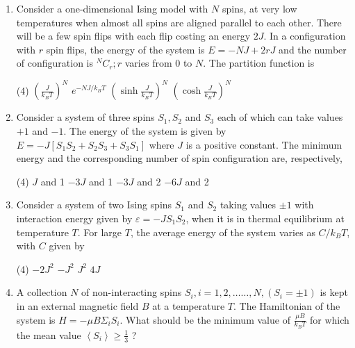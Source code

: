 \begin{enumerate}
\begin{tasks}
		\task[\textbf{b.}]Oscillates during evolution to equilibrium
		\task[\textbf{c.}]Is a maximum at equilibrium
		\task[\textbf{d.}]Is a minimum at equilibrium 
	\end{tasks}
\item 	Consider a one-dimensional Ising model with $N$ spins, at very low temperatures when almost all spins are aligned parallel to each other. There will be a few spin flips with each flip costing an energy $2 J$. In a configuration with $r$ spin flips, the energy of the system is $E=-N J+2 r J$ and the number of configuration is ${ }^{N} C_{r} ; r$ varies from 0 to $N$. The partition function is
{	}
	 \begin{tasks}(4)
		\task[\textbf{a.}] $\left(\frac{J}{k_{B} T}\right)^{N}$
		\task[\textbf{b.}]$e^{-N J / k_{B} T}$
		\task[\textbf{c.}] $\left(\sinh \frac{J}{k_{B} T}\right)^{N}$
		\task[\textbf{d.}] $\left(\cosh \frac{J}{k_{B} T}\right)^{N}$
	\end{tasks}
	\item Consider a system of three spins $S_{1}, S_{2}$ and $S_{3}$ each of which can take values $+1$ and $-1$. The energy of the system is given by $E=-J\left[S_{1} S_{2}+S_{2} S_{3}+S_{3} S_{1}\right]$ where $J$ is a positive constant. The minimum energy and the corresponding number of spin configuration are, respectively,
	{	}
	 \begin{tasks}(4)
		\task[\textbf{a.}]$J$ and 1
		\task[\textbf{b.}]$-3 J$ and 1
		\task[\textbf{c.}]$-3 J$ and 2
		\task[\textbf{d.}]  $-6 J$ and 2
	\end{tasks}
\item 	Consider a system of two Ising spins $S_{1}$ and $S_{2}$ taking values $\pm 1$ with interaction energy given by $\varepsilon=-J S_{1} S_{2}$, when it is in thermal equilibrium at temperature $T$. For large $T$, the average energy of the system varies as $C / k_{B} T$, with $C$ given by
{	}
	 \begin{tasks}(4)
		\task[\textbf{a.}]$-2 J^{2}$
		\task[\textbf{b.}] $-J^{2}$
		\task[\textbf{c.}]$J^{2}$
		\task[\textbf{d.}] $4 J$ 
	\end{tasks}
\item A collection $N$ of non-interacting spins $S_{i}, i=1,2, \ldots \ldots, N,\left(S_{i}=\pm 1\right)$ is kept in an external magnetic field $B$ at a temperature $T$. The Hamiltonian of the system is $H=-\mu B \Sigma_{i} S_{i}$. What should be the minimum value of $\frac{\mu B}{k_{B} T}$ for which the mean value $\left\langle S_{i}\right\rangle \geq \frac{1}{3}$ ?

\end{enumerate}

